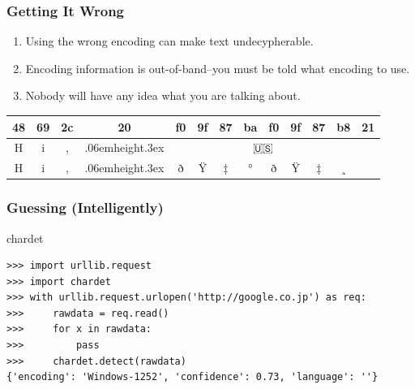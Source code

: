 \documentclass[smaller,xcolor=table,aspectratio=169]{beamer}
\newcommand\Vtextvisiblespace[1][.3em]{%
  \mbox{\kern.06em\vrule height.3ex}%
  \vbox{\hrule width#1}%
  \hbox{\vrule height.3ex}}
\begin{document}
\begin{frame}
  \frametitle{Getting It Wrong}
  \begin{enumerate}
    \item Using the wrong encoding can make text undecypherable.
    \item Encoding information is out-of-band--you must be told what encoding to use.
    \item Nobody will have any idea what you are talking about.
  \end{enumerate}

  \begin{table}
    \small
    \begin{tabular}{|c|c|c|c|c|c|c|c|c|c|c|c|c|}
      \hline
      48 & 69 & 2c & 20 & f0 & 9f & 87 & ba & f0 & 9f & 87 & b8 & 21 \\ \hline
      H & i & , & \Vtextvisiblespace & \multicolumn{8}{c|}{\emojifont 🇺🇸} \\ \hline
      H & i & , & \Vtextvisiblespace & ð & Ÿ & ‡ & ° & ð & Ÿ & ‡ & ¸ \\ \hline
    \end{tabular}
  \end{table}
\end{frame}

\lstset{language=Python}

\begin{frame}[fragile]
  \frametitle{Guessing (Intelligently)}
  chardet
  \begin{lstlisting}[style=mystyle]
>>> import urllib.request
>>> import chardet
>>> with urllib.request.urlopen('http://google.co.jp') as req:
>>>     rawdata = req.read()
>>>     for x in rawdata:
>>>         pass
>>>     chardet.detect(rawdata)
{'encoding': 'Windows-1252', 'confidence': 0.73, 'language': ''}
  \end{lstlisting}

\end{frame}
\end{document}
